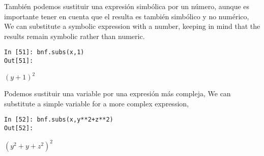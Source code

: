 \begin{paracol}{2}
También podemos sustituir una expresión simbólica por un número, aunque es importante tener en cuenta que el resulta es también simbólico y no numérico,
\switchcolumn
We can substitute a symbolic expression with a number, keeping in mind that the results remain symbolic rather than numeric.
\end{paracol}
\begin{center}
	\begin{minipage}{.25\textwidth}
		\begin{verbatim}
In [51]: bnf.subs(x,1)
Out[51]: 
		\end{verbatim}
		$(y+1)^2$
	\end{minipage}
\end{center}
\begin{paracol}{2}
Podemos sustituir una variable por una expresión más compleja,
\switchcolumn
We can substitute a simple variable for a more complex expression,
\end{paracol}
\begin{center}
	\begin{minipage}{.25\textwidth}
		\begin{verbatim}
In [52]: bnf.subs(x,y**2+z**2)
Out[52]:
\end{verbatim}
		$(y^2+y+z^2)^2$
	\end{minipage}
\end{center}

